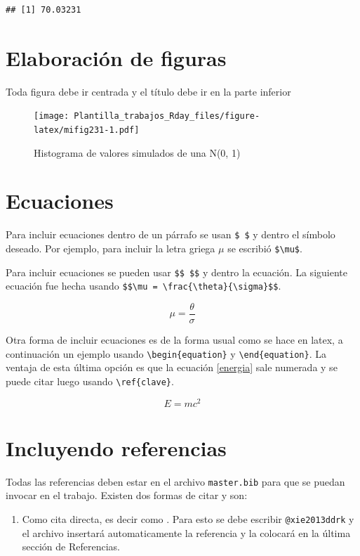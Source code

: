 \documentclass[]{article}
\providecommand{\tightlist}{%
\setlength{\itemsep}{0pt}\setlength{\parskip}{0pt}}
\begin{document}
\begin{verbatim}
## [1] 70.03231
\end{verbatim}

\hypertarget{elaboracion-de-figuras}{%
\section{Elaboración de figuras}\label{elaboracion-de-figuras}}

Toda figura debe ir centrada y el título debe ir en la parte inferior

\begin{figure}
\centering
\texttt{[image: Plantilla\_trabajos\_Rday\_files/figure-latex/mifig231-1.pdf]}
\caption{Histograma de valores simulados de una N(0, 1)}
\end{figure}

\hypertarget{ecuaciones}{%
\section{Ecuaciones}\label{ecuaciones}}

Para incluir ecuaciones dentro de un párrafo se usan \texttt{\$\ \$} y
dentro el símbolo deseado. Por ejemplo, para incluir la letra griega
\(\mu\) se escribió \texttt{\$\textbackslash{}mu\$}. \newline 

Para incluir ecuaciones se pueden usar \texttt{\$\$\ \$\$} y dentro la
ecuación. La siguiente ecuación fue hecha usando
\texttt{\$\$\textbackslash{}mu\ =\ \textbackslash{}frac\{\textbackslash{}theta\}\{\textbackslash{}sigma\}\$\$}.

\[\mu = \frac{\theta}{\sigma}\]

Otra forma de incluir ecuaciones es de la forma usual como se hace en
latex, a continuación un ejemplo usando
\texttt{\textbackslash{}begin\{equation\}} y
\texttt{\textbackslash{}end\{equation\}}. La ventaja de esta última
opción es que la ecuación \ref{energia} sale numerada y se puede citar
luego usando \texttt{\textbackslash{}ref\{clave\}}.

\begin{equation} \label{energia}
E = m c^2
\end{equation}

\hypertarget{incluyendo-referencias}{%
\section{Incluyendo referencias}\label{incluyendo-referencias}}

Todas las referencias deben estar en el archivo \texttt{master.bib} para
que se puedan invocar en el trabajo. Existen dos formas de citar y son:

\begin{enumerate}
\def\labelenumi{\arabic{enumi}.}
\tightlist
\item
  Como cita directa, es decir como \citet{xie2013ddrk}. Para esto se
  debe escribir \texttt{@xie2013ddrk} y el archivo insertará
  automaticamente la referencia y la colocará en la última sección de
  Referencias.
\end{enumerate}




\newpage
\singlespacing 
\end{document}
